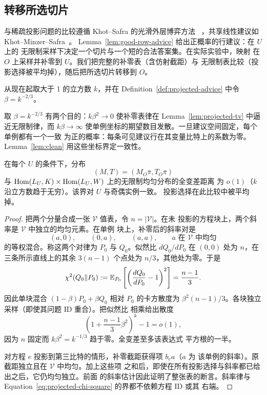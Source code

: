 \subsection{转移所选切片}

与稀疏投影问题的比较遵循 Khot--Safra 的光滑外层博弈方法
~\cite[Section~3 and Lemma~3.1]{KS13}，共享线性建议如
Khot--Minzer--Safra~\cite[Sections~3.3--3.4]{KMS17}。
Lemma~\ref{lem:good-row-advice} 给出正概率的行建议：在 $U$ 上的
无限制采样下决定一个切片与一个短的合法答案集。在实际实验中，映射
在 $O$ 上采样并补零到 $U$。我们把完整的补零表（含仿射截距）与
无限制表比较（投影选择被平均掉），随后把所选切片转移到 $O$。

从现在起取大于 1 的立方数 $k$，并在 Definition~\ref{def:projected-advice}
中令 $\beta=k^{-2/3}$。

取 $\beta=k^{-2/3}$ 有两个目的：$k\beta^2\to0$ 使补零表律在
Lemma~\ref{lem:projected-tv} 中逼近无限制律，而 $k\beta\to\infty$
使单例坐标的期望数目发散。一旦建议空间固定，每个单例都有一个一致
为正的概率：每条可见建议行在其变量比特上的系数为零。
Lemma~\ref{lem:clean} 用这些坐标界定一致性。

\begin{lemma}[补零矩阵渐近均匀]
\label{lem:projected-tv}
在每个 $U$ 的条件下，分布
\[
 (M,T)=(M_O\bar\pi,T_O\bar\pi)
\]
与 $\operatorname{Hom}(L_U,K)\times\operatorname{Hom}(L_U,W)$ 上的无限制均匀分布的全变差距离
为 $o(1)$（$k$ 沿立方数趋于无穷）。该界对 $U$ 与奇偶实例一致。
投影选择在此比较中被平均掉。
\end{lemma}

\begin{proof}
把两个分量合成一张 $\mathcal V$ 值表，令 $n=|\mathcal V|$。在未
投影的方程块上，两个斜率是 $\mathcal V$ 中独立的均匀元素。在单例
块上，补零后的斜率对是
\[
 (a,0),\qquad (0,a),\qquad (a,a),
 \qquad a\text{ 在 }\mathcal V\text{ 中均匀}
\]
的等权混合。称这两个对律为 $P_0$ 与 $Q_0$。似然比 $dQ_0/dP_0$ 在
$(0,0)$ 处为 $n$，在三条所示直线上的其余 $3(n-1)$ 个点处为
$n/3$，其他处为零。于是
\[
 \chi^2(Q_0\Vert P_0)
 :=\mathbb E_{P_0}\left[\left(\frac{dQ_0}{dP_0}-1\right)^2\right]
 =\frac{n-1}{3}.
\]
因此单块混合 $(1-\beta)P_0+\beta Q_0$ 相对 $P_0$ 的卡方散度为
$\beta^2(n-1)/3$。各块独立采样（即使其问题 ID 重合）。把似然比
相乘给出散度
\begin{equation}
 \left(1+\frac{n-1}{3}\beta^2\right)^k-1=o(1),
 \label{eq:projected-chi-square}
\end{equation}
因为 $n$ 固定而 $k\beta^2=k^{-1/3}$ 趋于零。全变差至多该表达式
平方根的一半。

对方程 $e$ 投影到第三比特的情形，补零截距获得项 $b_e a$（$a$ 为
该单例的斜率）。原截距独立且在 $\mathcal V$ 中均匀。加上这些项
之和后，即使在所有投影选择与斜率都已给出之后，它仍均匀独立。前面
的斜率估计因此证明了整张表的断言。斜率律与
Equation~\eqref{eq:projected-chi-square} 的界都不依赖方程 ID 或其
右端。
\end{proof}

